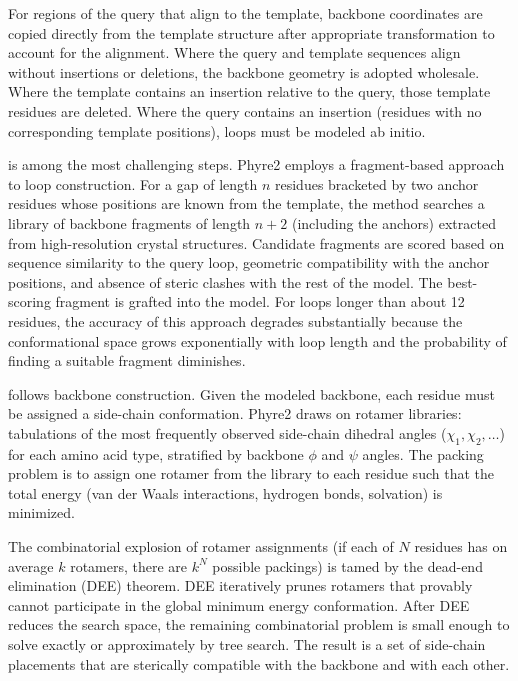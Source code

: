 For regions of the query that align to the template, backbone coordinates are copied directly from the template structure after appropriate transformation to account for the alignment. Where the query and template sequences align without insertions or deletions, the backbone geometry is adopted wholesale. Where the template contains an insertion relative to the query, those template residues are deleted. Where the query contains an insertion (residues with no corresponding template positions), loops must be modeled ab initio.

 is among the most challenging steps. Phyre2 employs a fragment-based approach to loop construction. For a gap of length $n$ residues bracketed by two anchor residues whose positions are known from the template, the method searches a library of backbone fragments of length $n+2$ (including the anchors) extracted from high-resolution crystal structures. Candidate fragments are scored based on sequence similarity to the query loop, geometric compatibility with the anchor positions, and absence of steric clashes with the rest of the model. The best-scoring fragment is grafted into the model. For loops longer than about 12 residues, the accuracy of this approach degrades substantially because the conformational space grows exponentially with loop length and the probability of finding a suitable fragment diminishes.

 follows backbone construction. Given the modeled backbone, each residue must be assigned a side-chain conformation. Phyre2 draws on rotamer libraries: tabulations of the most frequently observed side-chain dihedral angles ($\chi_1, \chi_2, \ldots$) for each amino acid type, stratified by backbone $\phi$ and $\psi$ angles. The packing problem is to assign one rotamer from the library to each residue such that the total energy (van der Waals interactions, hydrogen bonds, solvation) is minimized.

The combinatorial explosion of rotamer assignments (if each of $N$ residues has on average $k$ rotamers, there are $k^N$ possible packings) is tamed by the dead-end elimination (DEE) theorem. DEE iteratively prunes rotamers that provably cannot participate in the global minimum energy conformation. After DEE reduces the search space, the remaining combinatorial problem is small enough to solve exactly or approximately by tree search. The result is a set of side-chain placements that are sterically compatible with the backbone and with each other.

